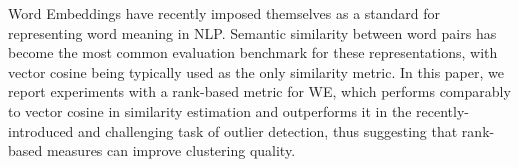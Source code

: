 Word Embeddings have recently imposed themselves as a standard for representing word meaning in NLP. Semantic similarity between word pairs has become the most common evaluation benchmark for these representations, with vector cosine being typically used as the only similarity metric. In this paper, we report experiments with a rank-based metric for WE, which performs comparably to vector cosine in similarity estimation and outperforms it in the recently-introduced and challenging task of outlier detection, thus suggesting that rank-based measures can improve clustering quality.
